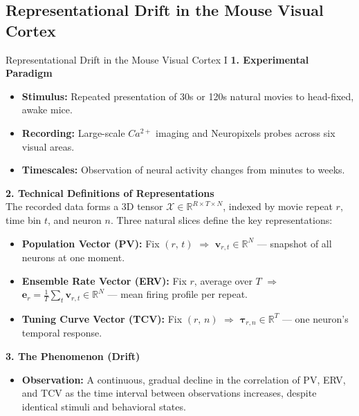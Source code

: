 \documentclass[aspectratio=169,xcolor=dvipsnames]{beamer}
\begin{document}
	\subsection{Representational Drift in the Mouse Visual Cortex}
	\begin{frame}{Representational Drift in the Mouse Visual Cortex I}
		\small
		\textbf{1. Experimental Paradigm}
		\begin{itemize}
			\item \textbf{Stimulus:} Repeated presentation of 30s or 120s natural movies to head-fixed, awake mice.
			\item \textbf{Recording:} Large-scale $Ca^{2+}$ imaging and Neuropixels probes across six visual areas.
			\item \textbf{Timescales:} Observation of neural activity changes from minutes to weeks.
		\end{itemize}

		\textbf{2. Technical Definitions of Representations} \\
		The recorded data forms a 3D tensor $\mathcal{X} \in \mathbb{R}^{R \times T \times N}$, indexed by movie repeat $r$, time bin $t$, and neuron $n$. Three natural slices define the key representations:
		\begin{itemize}
			\item \textbf{Population Vector (PV):} Fix $(r,\,t)$ $\Rightarrow$ $\mathbf{v}_{r,t} \in \mathbb{R}^{N}$ — snapshot of all neurons at one moment.
			\item \textbf{Ensemble Rate Vector (ERV):} Fix $r$, average over $T$ $\Rightarrow$ $\mathbf{e}_{r} = \frac{1}{T}\sum_{t} \mathbf{v}_{r,t} \in \mathbb{R}^{N}$ — mean firing profile per repeat.
			\item \textbf{Tuning Curve Vector (TCV):} Fix $(r,\,n)$ $\Rightarrow$ $\boldsymbol{\tau}_{r,n} \in \mathbb{R}^{T}$ — one neuron's temporal response.
		\end{itemize}

		\textbf{3. The Phenomenon (Drift)}
		\begin{itemize}
			\item \textbf{Observation:} A continuous, gradual decline in the correlation of PV, ERV, and TCV as the time interval between observations increases, despite identical stimuli and behavioral states.
		\end{itemize}
	\end{frame}
	
\end{document}
